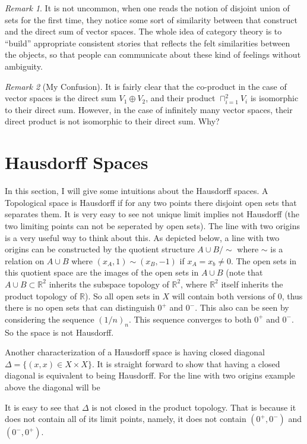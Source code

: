 \documentclass[11pt,a4paper]{article}
\newcommand{\set}[1]{\{#1\}}
\newcommand{\R}{\mathbb{R}}
\theoremstyle{definition}
\theoremstyle{remark}
\newtheorem{remark}{Remark}
\begin{document}
	
	\begin{remark}
		It is not uncommon, when one reads the notion of disjoint union of sets for the first time, they notice some sort of similarity between that construct and the direct sum of vector spaces. The whole idea of category theory is to ``build'' appropriate consistent stories that reflects the felt similarities between the objects, so that people can communicate about these kind of feelings without ambiguity.
	\end{remark}
	
	
	
	\begin{remark}[My Confusion]
		It is fairly clear that the co-product in the case of vector spaces is the direct sum $ V_1\oplus V_2 $, and their product $ \sqcap_{i=1}^2 V_i $ is isomorphic to their direct sum. However, in the case of infinitely many vector spaces, their direct product is not isomorphic to their direct sum. Why?
	\end{remark}
	
	
	\section{Hausdorff Spaces}
	In this section, I will give some intuitions about the Hausdorff spaces. A Topological space is Hausdorff if for any two points there disjoint open sets that separates them. It is very easy to see not unique limit implies not Hausdorff (the two limiting points can not be seperated by open sets). The line with two origins is a very useful way to think about this. As depicted below, a line with two origins can be constructed by the quotient structure $ A\cup B / \sim $ where $ \sim $ is a relation on $ A\cup B $ where $ (x_A,1) \sim (x_B,-1) $ if $ x_A=x_b \neq 0 $. The open sets in this quotient space are the images of the open sets in $ A\cup B $ (note that $ A\cup B \subset \R^2 $ inherits the subspace topology of $ \R^2 $, where $ \R^2 $ itself inherits the product topology of $ \R $). So all open sets in $ X $ will contain both versions of $ 0 $, thus there is no open sets that can distinguish $ 0^+ $ and $ 0^- $. This also can be seen by considering the sequence $ (1/n)_n $. This sequence converges to both $ 0^+ $ and $ 0^- $. So the space is not Hausdorff.
	
	
	\FloatBarrier
	
	Another characterization of a Hausdorff space is having closed diagonal $ \Delta = \set{(x,x)\in X\times X} $. It is straight forward to show that having a closed diagonal is equivalent to being Hausdorff. For the line with two origins example above the diagonal will be
	
	\FloatBarrier
	It is easy to see that $ \Delta $ is not closed in the product topology. That is because it does not contain all of its limit points, namely, it does not contain $ (0^+,0^-) $ and $ (0^-,0^+) $.
	
	
	
	
\end{document}
